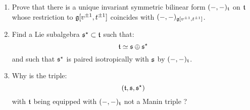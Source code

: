             \begin{question} \label{question: extending_invariant_inner_products_on_multi_loop_to_universal_central_extensions}
                \begin{enumerate}
                    \item Prove that there is a unique invariant symmetric bilinear form $(-, -)_{\mathfrak{t}}$ on $\mathfrak{t}$ whose restriction to $\mathfrak{g}[v^{\pm 1}, t^{\pm 1}]$ coincides with $(-, -)_{\mathfrak{g}[v^{\pm 1}, t^{\pm 1}]}$.
                    \item Find a Lie subalgebra $\mathfrak{s}^{\star} \subset \mathfrak{t}$ such that:
                        $$\mathfrak{t} \simeq \mathfrak{s} \oplus \mathfrak{s}^{\star}$$
                    and such that $\mathfrak{s}^{\star}$ is paired isotropically with $\mathfrak{s}$ by $(-, -)_{\mathfrak{t}}$. 
                    \item Why is the triple:
                        $$(\mathfrak{t}, \mathfrak{s}, \mathfrak{s}^{\star})$$
                    with $\mathfrak{t}$ being equipped with $(-, -)_{\mathfrak{t}}$ not a Manin triple ?
                \end{enumerate}
            \end{question}
